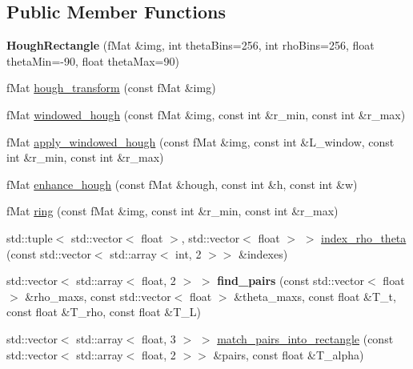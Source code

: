 \subsection*{Public Member Functions}
\begin{DoxyCompactItemize}
\item 
\mbox{\label{class_hough_rectangle_ab5ab09cbfe4cebb830a2c75d4112df95}} 
{\bfseries Hough\+Rectangle} (f\+Mat \&img, int theta\+Bins=256, int rho\+Bins=256, float theta\+Min=-\/90, float theta\+Max=90)
\item 
f\+Mat \mbox{\hyperlink{class_hough_rectangle_ab3ff810c6e33c8d0832d49c7347b500b}{hough\+\_\+transform}} (const f\+Mat \&img)
\item 
f\+Mat \mbox{\hyperlink{class_hough_rectangle_aca6876916a1b547dbd36e9a7f0312473}{windowed\+\_\+hough}} (const f\+Mat \&img, const int \&r\+\_\+min, const int \&r\+\_\+max)
\item 
f\+Mat \mbox{\hyperlink{class_hough_rectangle_a5e4e337efcd49b7c0c77ee180847197f}{apply\+\_\+windowed\+\_\+hough}} (const f\+Mat \&img, const int \&L\+\_\+window, const int \&r\+\_\+min, const int \&r\+\_\+max)
\item 
f\+Mat \mbox{\hyperlink{class_hough_rectangle_ae4692e63ca5846f48045778b1e377362}{enhance\+\_\+hough}} (const f\+Mat \&hough, const int \&h, const int \&w)
\item 
f\+Mat \mbox{\hyperlink{class_hough_rectangle_aa43d49848bcf0ceafe1444e744222d5c}{ring}} (const f\+Mat \&img, const int \&r\+\_\+min, const int \&r\+\_\+max)
\item 
std\+::tuple$<$ std\+::vector$<$ float $>$, std\+::vector$<$ float $>$ $>$ \mbox{\hyperlink{class_hough_rectangle_aedd6bcecc2e612a2581e34029afe0cb8}{index\+\_\+rho\+\_\+theta}} (const std\+::vector$<$ std\+::array$<$ int, 2 $>$$>$ \&indexes)
\item 
\mbox{\label{class_hough_rectangle_a20e04bf149b566202e3b9ebf81829253}} 
std\+::vector$<$ std\+::array$<$ float, 2 $>$ $>$ {\bfseries find\+\_\+pairs} (const std\+::vector$<$ float $>$ \&rho\+\_\+maxs, const std\+::vector$<$ float $>$ \&theta\+\_\+maxs, const float \&T\+\_\+t, const float \&T\+\_\+rho, const float \&T\+\_\+L)
\item 
std\+::vector$<$ std\+::array$<$ float, 3 $>$ $>$ \mbox{\hyperlink{class_hough_rectangle_a6605c68fdf0577bb6b96403ecd0c59b2}{match\+\_\+pairs\+\_\+into\+\_\+rectangle}} (const std\+::vector$<$ std\+::array$<$ float, 2 $>$$>$ \&pairs, const float \&T\+\_\+alpha)
\end{DoxyCompactItemize}
